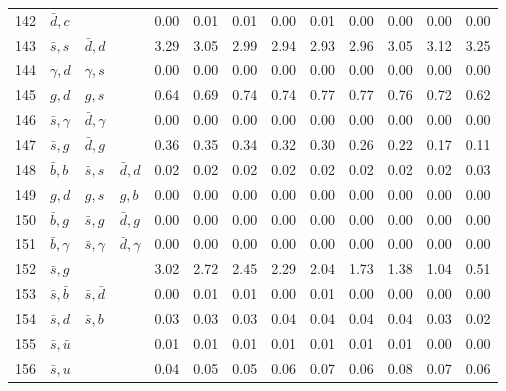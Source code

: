 \begin{tabularx}{\textwidth}{rXXX@{}S@{}S@{}S@{}S@{}S@{}S@{}S@{}S@{}S}
142 & $\bar d, c$      &                   &                  &  0.00 &  0.01 &  0.01 &  0.00 &  0.01 &  0.00 &  0.00 &  0.00 &  0.00 \\
143 & $\bar s, s$      & $\bar d, d$       &                  &  3.29 &  3.05 &  2.99 &  2.94 &  2.93 &  2.96 &  3.05 &  3.12 &  3.25 \\
144 & $\gamma, d$      & $\gamma, s$       &                  &  0.00 &  0.00 &  0.00 &  0.00 &  0.00 &  0.00 &  0.00 &  0.00 &  0.00 \\
145 & $g, d$           & $g, s$            &                  &  0.64 &  0.69 &  0.74 &  0.74 &  0.77 &  0.77 &  0.76 &  0.72 &  0.62 \\
146 & $\bar s, \gamma$ & $\bar d, \gamma$  &                  &  0.00 &  0.00 &  0.00 &  0.00 &  0.00 &  0.00 &  0.00 &  0.00 &  0.00 \\
147 & $\bar s, g$      & $\bar d, g$       &                  &  0.36 &  0.35 &  0.34 &  0.32 &  0.30 &  0.26 &  0.22 &  0.17 &  0.11 \\
148 & $\bar b,  b$     & $\bar s, s$       & $\bar d, d$      &  0.02 &  0.02 &  0.02 &  0.02 &  0.02 &  0.02 &  0.02 &  0.02 &  0.03 \\
149 & $g,  d$          & $g, s$            & $g, b$           &  0.00 &  0.00 &  0.00 &  0.00 &  0.00 &  0.00 &  0.00 &  0.00 &  0.00 \\
150 & $\bar b, g$      & $\bar s, g$       & $\bar d, g$      &  0.00 &  0.00 &  0.00 &  0.00 &  0.00 &  0.00 &  0.00 &  0.00 &  0.00 \\
151 & $\bar b, \gamma$ & $\bar s, \gamma$  & $\bar d, \gamma$ &  0.00 &  0.00 &  0.00 &  0.00 &  0.00 &  0.00 &  0.00 &  0.00 &  0.00 \\
152 & $\bar s, g$      &                   &                  &  3.02 &  2.72 &  2.45 &  2.29 &  2.04 &  1.73 &  1.38 &  1.04 &  0.51 \\
153 & $\bar s, \bar b$ & $\bar s, \bar d$  &                  &  0.00 &  0.01 &  0.01 &  0.00 &  0.01 &  0.00 &  0.00 &  0.00 &  0.00 \\
154 & $\bar s, d$      & $\bar s, b$       &                  &  0.03 &  0.03 &  0.03 &  0.04 &  0.04 &  0.04 &  0.04 &  0.03 &  0.02 \\
155 & $\bar s, \bar u$ &                   &                  &  0.01 &  0.01 &  0.01 &  0.01 &  0.01 &  0.01 &  0.01 &  0.00 &  0.00 \\
156 & $\bar s, u$      &                   &                  &  0.04 &  0.05 &  0.05 &  0.06 &  0.07 &  0.06 &  0.08 &  0.07 &  0.06 \\

\end{tabularx}
